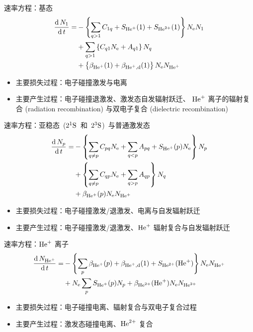 \begin{frame}{速率方程：基态}
	\[
	\begin{aligned}
		\frac{{\rm d}\,N_1}{{\rm d}\,t}=
			&-\left\{\sum_{q>1}C_{1q}+S_{{\rm He}^+}(1)+S_{{\rm He}^{2+}}(1)\right\}N_{\rm e}N_1\\
			&+\sum_{q>1}\left\{C_{q1}N_{\rm e}+A_{q1}\right\}N_q\\
			&+\left\{\beta_{{\rm He}^+}(1)+\beta_{{\rm He}^+,\rm d}(1)\right\}N_{\rm e}N_{{\rm He}^+}
	\end{aligned}
	\]
	\begin{itemize}
		\item 主要损失过程：电子碰撞激发与电离
		\item 主要产生过程：电子碰撞退激发、激发态自发辐射跃迁、
			${\rm He}^+$ 离子的辐射复合 (radiation recombination)
			与双电子复合 (dielectric recombination)
	\end{itemize}
\end{frame}

\begin{frame}{速率方程：亚稳态~($2^1{\rm S}$~和~$2^3{\rm S}$)~与普通激发态}
	\[
	\begin{aligned}
		\frac{{\rm d}\,N_p}{{\rm d}\,t}=
		&-\left\{\sum_{q\ne p}C_{pq}N_{\rm e}+\sum_{q<p}A_{pq}+S_{{\rm He}^+}(p)N_{\rm e}\right\}N_p\\
		&+\left\{\sum_{q\ne p}C_{qp}N_{\rm e}+\sum_{q>p}A_{qp}\right\}N_q\\
		&+\beta_{{\rm He}^+}(p)N_{\rm e}N_{{\rm He}^+}
	\end{aligned}
	\]
	\begin{itemize}
		\item 主要损失过程：电子碰撞激发/退激发、电离与自发辐射跃迁
		\item 主要产生过程：电子碰撞激发/退激发、${\rm He}^+$ 辐射复合与自发辐射跃迁
	\end{itemize}
\end{frame}

\begin{frame}{速率方程：${\rm He}^+$ 离子}
	\[
	\begin{aligned}
		\frac{{\rm d}\,N_{{\rm He}^+}}{{\rm d}\,t}=
		&-\left\{\sum_{p}\beta_{{\rm He}^+}(p)+\beta_{{\rm He}^+,{\rm d}}(1)+S_{{\rm He}^{2+}}({\rm He}^+)\right\}N_{\rm e}N_{{\rm He}^+}\\
		&+N_{\rm e}\sum_{p}S_{{\rm He}^+}(p)N_p+\beta_{{\rm He}^{2+}}({\rm He}^{+})N_{\rm e}N_{{\rm He}^{2+}}
	\end{aligned}
	\]
	\begin{itemize}
		\item 主要损失过程：电子碰撞电离、辐射复合与双电子复合过程
		\item 主要产生过程：激发态碰撞电离、${\rm He}^{2+}$ 复合
	\end{itemize}
\end{frame}

